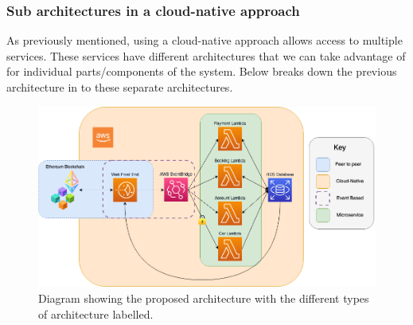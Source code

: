   \newpage
  \subsubsection{Sub architectures in a cloud-native approach}
  As previously mentioned, using a cloud-native approach allows access to multiple services. These services have different architectures that we can take
  advantage of for individual parts/components of the system. Below breaks down the previous architecture in to these separate architectures.

  \begin{figure}[H]
    \centering
    \includegraphics[width=12cm]{assets/architectureSectionedEvents.drawio.png}
    \caption{Diagram showing the proposed architecture with the different types of architecture labelled.}
    \label{fig:architectureSectioned}
  \end{figure}

